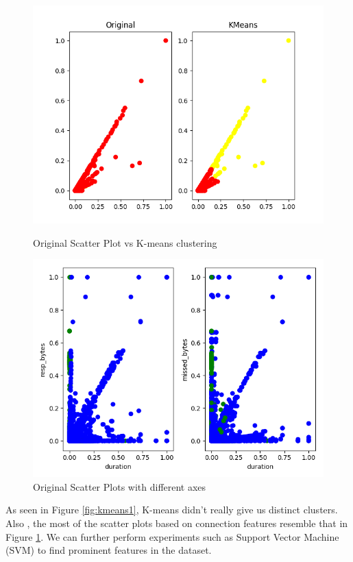 \begin{figure}[htb]
	\centering
	\includegraphics[width=1\textwidth]{images/kmeans.png}
	\caption{Original Scatter Plot vs K-means clustering} 
	\label{fig:kmeans1}
	
	\centering
	\includegraphics[width=1\textwidth]{images/kmeans2.png}
	\caption{Original Scatter Plots with different axes} 
	\label{fig:kmeans2}
\end{figure}

As seen in Figure \ref{fig:kmeans1}, K-means didn't really give us distinct clusters. Also , the most of the scatter plots based on connection features resemble that in Figure \ref{fig:kmeans2}. We can further perform experiments such as Support Vector Machine (SVM) to find prominent features in the dataset.

